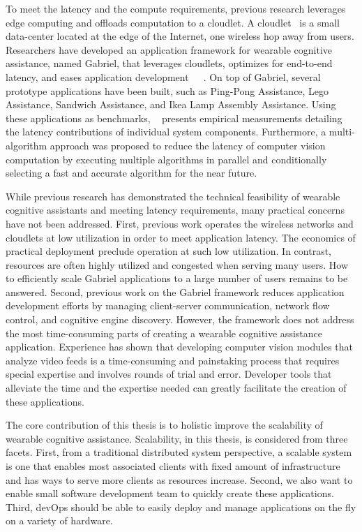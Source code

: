 To meet the latency and the compute requirements, previous research leverages
edge computing and offloads computation to a cloudlet. A
cloudlet~\cite{satyanarayanan2009case} is a small data-center located at the
edge of the Internet, one wireless hop away from users. Researchers have
developed an application framework for wearable cognitive assistance, named
Gabriel, that leverages cloudlets, optimizes for end-to-end latency, and eases
application
development~\cite{chen2018application}~\cite{ha2014towards}~\cite{chen2017empirical}.
On top of Gabriel, several prototype applications have been built, such as
Ping-Pong Assistance, Lego Assistance, Sandwich Assistance, and Ikea Lamp
Assembly Assistance. Using these applications as benchmarks,
~\cite{chen2017empirical} presents empirical measurements detailing the latency
contributions of individual system components. Furthermore, a multi-algorithm
approach was proposed to reduce the latency of computer vision computation by
executing multiple algorithms in parallel and conditionally selecting a fast and
accurate algorithm for the near future.

While previous research has demonstrated the technical feasibility of wearable
cognitive assistants and meeting latency requirements, many practical concerns
have not been addressed. First, previous work operates the wireless networks and
cloudlets at low utilization in order to meet application latency. The economics
of practical deployment preclude operation at such low utilization. In contrast,
resources are often highly utilized and congested when serving many users. How
to efficiently scale Gabriel applications to a large number of users remains to
be answered. Second, previous work on the Gabriel framework reduces application
development efforts by managing client-server communication, network flow
control, and cognitive engine discovery. However, the framework does not address
the most time-consuming parts of creating a wearable cognitive assistance
application. Experience has shown that developing computer vision modules that
analyze video feeds is a time-consuming and painstaking process that requires
special expertise and involves rounds of trial and error. Developer tools that
alleviate the time and the expertise needed can greatly facilitate the creation
of these applications.

The core contribution of this thesis is to holistic improve the scalability of
wearable cognitive assistance. Scalability, in this thesis, is considered from
three facets. First, from a traditional distributed system perspective, a
scalable system is one that enables most associated clients with fixed amount of
infrastructure and has ways to serve more clients as resources increase. Second,
we also want to enable small software development team to quickly create these
applications. Third, devOps should be able to easily deploy and manage
applications on the fly on a variety of hardware.

